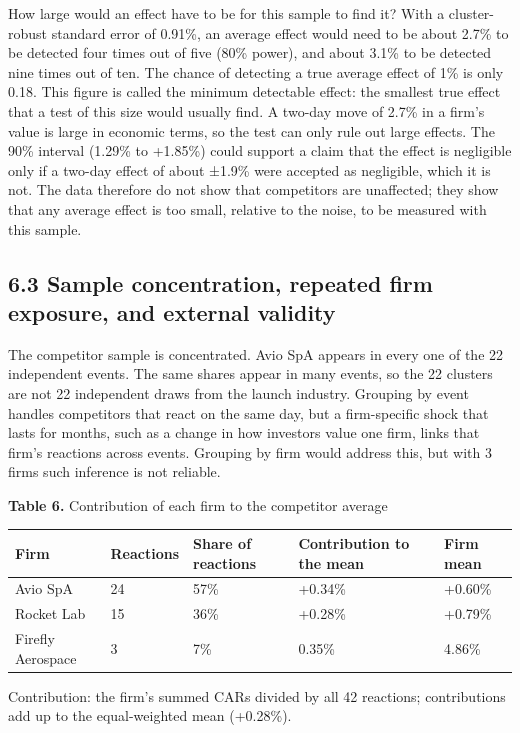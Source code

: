 \documentclass[12pt,a4paper]{article}
\begin{document}
How large would an effect have to be for this sample to find it? With a cluster-robust standard error of 0.91\%, an average effect would need to be about 2.7\% to be detected four times out of five (80\% power), and about 3.1\% to be detected nine times out of ten. The chance of detecting a true average effect of 1\% is only 0.18. This figure is called the minimum detectable effect: the smallest true effect that a test of this size would usually find. A two-day move of 2.7\% in a firm's value is large in economic terms, so the test can only rule out large effects. The 90\% interval (\textminus{}1.29\% to +1.85\%) could support a claim that the effect is negligible only if a two-day effect of about ±1.9\% were accepted as negligible, which it is not. The data therefore do not show that competitors are unaffected; they show that any average effect is too small, relative to the noise, to be measured with this sample.

\subsection*{6.3 Sample concentration, repeated firm exposure, and external validity}
The competitor sample is concentrated. Avio SpA appears in every one of the 22 independent events. The same shares appear in many events, so the 22 clusters are not 22 independent draws from the launch industry. Grouping by event handles competitors that react on the same day, but a firm-specific shock that lasts for months, such as a change in how investors value one firm, links that firm's reactions across events. Grouping by firm would address this, but with 3 firms such inference is not reliable.

\par\noindent\begin{minipage}{\textwidth}\hypertarget{tab-contrib}{}
\textbf{Table 6.} Contribution of each firm to the competitor average

{\small\setlength{\tabcolsep}{4pt}\begin{tabularx}{\textwidth}{lllXl}
\toprule
\textbf{Firm} & \textbf{Reactions} & \textbf{Share of reactions} & \textbf{Contribution to the mean} & \textbf{Firm mean} \\
\midrule
Avio SpA & 24 & 57\% & +0.34\% & +0.60\% \\
Rocket Lab & 15 & 36\% & +0.28\% & +0.79\% \\
Firefly Aerospace & 3 & 7\% & \textminus{}0.35\% & \textminus{}4.86\% \\
\bottomrule
\end{tabularx}}
\vspace{6pt}

Contribution: the firm's summed CARs divided by all 42 reactions; contributions add up to the equal-weighted mean (+0.28\%).

\end{minipage}\par\vspace{4pt}
\end{document}
